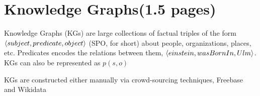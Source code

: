 \section{Knowledge Graphs(1.5 pages)}
\label{sec:kgs}

Knowledge Graphs (KGs) are large collections of factual triples of the form $\langle subject, predicate,object\rangle$ (SPO, for short) about people, organizations, places, etc. Predicates encodes the relations between them, \eg $\langle einstein, wasBornIn, Ulm\rangle$. KGs can also be represented as $p(s,o)$

 KGs are constructed either manually via crowd-sourcing techniques, \eg Freebase~\cite{Freebase} and Wikidata~\cite{wikidata}  


